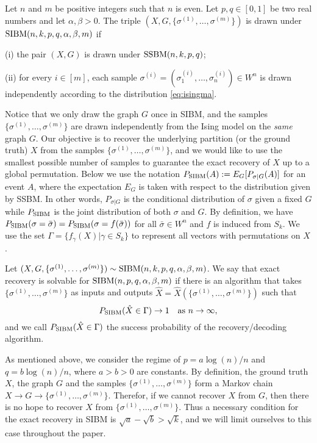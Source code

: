 \documentclass{article}
\begin{document}
\begin{definition}
Let $n$ and $m$ be positive integers such that $n$ is even. Let $p,q\in[0,1]$ be two real numbers and let $\alpha,\beta>0$. The triple $(X,G,\{\sigma^{(1)},\dots,\sigma^{(m)}\})$ is drawn under $\operatorname{SIBM}(n,k, p,q,\alpha,\beta,m)$ if

\noindent
(i) the pair $(X,G)$ is drawn under $\operatorname{SSBM}(n,k, p,q)$;

\noindent
(ii) for every $i\in[m]$, each sample $\sigma^{(i)}=(\sigma_1^{(i)},\dots,\sigma_n^{(i)}) \in W^n$ is drawn independently according to the distribution \eqref{eq:isingma}.
\end{definition}

Notice that we only draw the graph $G$ once in SIBM, and the samples $\{\sigma^{(1)},\dots,\sigma^{(m)}\}$ are drawn independently from the Ising model on the {\em same} graph $G$.
Our objective is to recover the underlying partition (or the ground truth) $X$ from the samples $\{\sigma^{(1)},\dots,\sigma^{(m)}\}$, and we would like to use the smallest possible number of samples to guarantee the exact recovery of $X$ up to a global permutation.
Below we use the notation $P_{\operatorname{SIBM}}(A):=E_G[P_{\sigma|G}(A)]$ for an event $A$, where the expectation $E_G$ is taken with respect to the distribution given by SSBM. In other words, $P_{\sigma|G}$ is the conditional distribution of  $\sigma$ given a fixed $G$ while $P_{\operatorname{SIBM}}$ is the joint distribution of both $\sigma$ and $G$.
By definition, we have $P_{\operatorname{SIBM}}(\sigma=\bar{\sigma})=P_{\operatorname{SIBM}}(\sigma=f(\bar{\sigma}))$ for all $\bar{\sigma}\in W^n$ and $f$ is induced from $S_k$. We use the set $\Gamma = \{f_{\gamma}(X) | \gamma \in S_k\}$ to
represent all vectors with permutations on $X$.

\begin{definition}
Let $(X,G,\{\sigma^{(1)},\dots,\sigma^{(m)}\}) \sim \operatorname{SIBM}(n,k, p,q,\alpha,\beta,m)$.
We say that exact recovery is solvable for $\operatorname{SIBM}(n,p,q,\alpha,\beta,m)$ if there is an algorithm that takes $\{\sigma^{(1)},\dots,\sigma^{(m)}\}$ as inputs and outputs $\hat{X}=\hat{X}(\{\sigma^{(1)},\dots,\sigma^{(m)}\})$ such that
$$
P_{\operatorname{SIBM}}(\hat{X} \in \Gamma) \to 1
\text{~~~as~} n\to\infty ,
$$
and we call $P_{\operatorname{SIBM}}(\hat{X} \in \Gamma)$ the success probability of the recovery/decoding algorithm.
\end{definition}


As mentioned above, we consider the regime of $p=a\log(n)/n$ and $q=b\log(n)/n$, where $a>b> 0$ are constants. By definition, the ground truth $X$, the graph $G$ and the samples $\{\sigma^{(1)},\dots,\sigma^{(m)}\}$ form a Markov chain $X\to G\to \{\sigma^{(1)},\dots,\sigma^{(m)}\}$. Therefor, if we cannot recover $X$ from $G$, then there is no hope to recover $X$ from $\{\sigma^{(1)},\dots,\sigma^{(m)}\}$. Thus a necessary condition for the exact recovery in SIBM is $\sqrt{a}-\sqrt{b}> \sqrt{k}$, and we will limit ourselves to this case throughout the paper.
\end{document}
